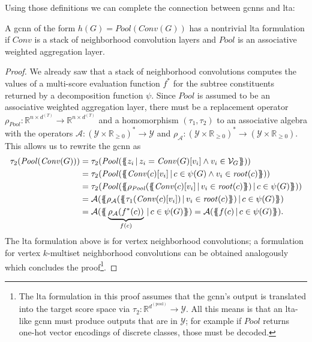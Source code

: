 Using those definitions we can complete the connection between \acp{gcnn} and \ac{lta}:
\begin{thm}\label{thm:ltag:gcnn-ltag-formulation}
	A \ac{gcnn} of the form $h(G) = \mathit{Pool}(\mathit{Conv}(G))$ has a nontrivial \ac{lta} formulation if $\mathit{Conv}$ is a stack of neighborhood convolution layers and $\mathit{Pool}$ is an associative weighted aggregation layer.
\end{thm}
\begin{proof}
	We already saw that a stack of neighborhood convolutions computes the values of a multi-score evaluation function $f^{*}$ for the subtree constituents returned by a decomposition function $\psi$.
	Since $\mathit{Pool}$ is assumed to be an associative weighted aggregation layer, there must be a replacement operator $\rho_{\mathit{Pool}}: \mathbb{R}^{n \times d^{(T)}} \to \mathbb{R}^{n \times d^{(T)}}$ and a homomorphism $(\tau_{1}, \tau_{2})$ to an associative algebra with the operators $\mathcal{A}: {(\mathcal{Y} \times \mathbb{R}_{\geq 0})}^{*} \to \mathcal{Y}$ and $\rho_{\mathcal{A}}: {(\mathcal{Y} \times \mathbb{R}_{\geq 0})}^{*} \to {(\mathcal{Y} \times \mathbb{R}_{\geq 0})}$.
	This allows us to rewrite the \ac{gcnn} as
	\begin{align*}
		\tau_2(\mathit{Pool}(\mathit{Conv}(G)))
		&= \tau_2(\mathit{Pool}(\ldblbrace z_i\, |\, z_i = \mathit{Conv}(G)[v_i] \land v_i \in \mathcal{V}_G \rdblbrace)) \\
		&= \tau_2(\mathit{Pool}(\ldblbrace \mathit{Conv}(c)[v_i]\, |\, c \in \psi(G) \land v_i \in \mathit{root}(c) \rdblbrace)) \\
		&= \tau_2(\mathit{Pool}(\ldblbrace \rho_{\mathit{Pool}}(\ldblbrace \mathit{Conv}(c)[v_i]\, |\, v_i \in \mathit{root}(c) \rdblbrace)\, |\, c \in \psi(G) \rdblbrace)) \\
		&= \mathcal{A}(\ldblbrace \rho_{\mathcal{A}}(\ldblbrace \tau_1(\mathit{Conv}(c)[v_i])\, |\, v_i \in \mathit{root}(c) \rdblbrace)\, |\, c \in \psi(G) \rdblbrace) \\
		&= \mathcal{A}(\ldblbrace \underbrace{\rho_{\mathcal{A}}(f^{*}(c))}_{f(c)}\, |\, c \in \psi(G) \rdblbrace)
		= \mathcal{A}(\ldblbrace f(c)\, |\, c \in \psi(G) \rdblbrace)
		\text{.}
	\end{align*}
	The \ac{lta} formulation above is for vertex neighborhood convolutions;
	a formulation for vertex $k$-multiset neighborhood convolutions can be obtained analogously which concludes the proof\footnote{
		The \ac{lta} formulation in this proof assumes that the \ac{gcnn}'s output is translated into the target score space via $\tau_{2}: \mathbb{R}^{d^{(\mathrm{pool})}} \to \mathcal{Y}$.
		All this means is that an \acs{lta}-like \ac{gcnn} must produce outputs that are in $\mathcal{Y}$;
		for example if $\mathit{Pool}$ returns one-hot vector encodings of discrete classes, those must be decoded.
	}.
\end{proof}
